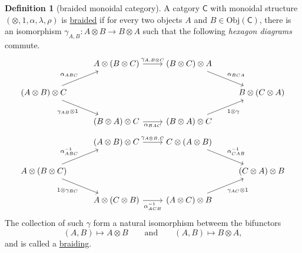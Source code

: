 \documentclass[a4paper]{report}
\newcommand{\defn}[1]{\ul{#1}}
\newcommand{\Obj}{\mathrm{Obj}}
\theoremstyle{definition}
\newtheorem{definition}{Definition}[section]
\theoremstyle{plain}
\theoremstyle{remark}
\begin{document}
\begin{definition}[braided monoidal category]
  \label{def:braidedmonoidalcategory}
  A catgory $\mathsf{C}$ with monoidal structure $(\otimes, 1, \alpha, \lambda, \rho)$ is \defn{braided} if for every two objects $A$ and $B \in \Obj(\mathsf{C})$, there is an isomorphism $\gamma_{A,B}\colon A \otimes B \to B \otimes A$ such that the following \emph{hexagon diagrams} commute.
  \begin{equation*}
    \begin{tikzcd}
      & A \otimes (B \otimes C) \arrow[r, "{\gamma_{A, B \otimes C}}"] & (B \otimes C) \otimes A \arrow[dr, "\alpha_{BCA}"] & \\
      (A \otimes B) \otimes C \arrow[ur, "\alpha_{ABC}"] \arrow[dr, swap, "\gamma_{AB} \otimes 1"] & & & B \otimes (C \otimes A) \\
      & (B \otimes A) \otimes C \arrow[r, swap, "\alpha_{BAC}"] & (B \otimes A) \otimes C \arrow[ur, swap, "1 \otimes \gamma"]
    \end{tikzcd}
  \end{equation*}
  \begin{equation*}
    \begin{tikzcd}
      & (A \otimes B) \otimes C \arrow[r, "{\gamma_{A \otimes B, C}}"] & C \otimes (A \otimes B) \arrow[dr, "\alpha^{-1}_{CAB}"] \\
      A \otimes (B \otimes C) \arrow[ur, "\alpha_{ABC}^{-1}"] \arrow[dr, swap, "1 \otimes \gamma_{BC}"] & & & (C \otimes A) \otimes B \\
      & A \otimes (C \otimes B) \arrow[r, swap, "\alpha^{-1}_{ACB}"] & (A \otimes C) \otimes B \arrow[ur, swap, "\gamma_{AC} \otimes 1"]
    \end{tikzcd} 
  \end{equation*}
  The collection of such $\gamma$ form a natural isomorphism betweem the bifunctors 
  \begin{equation*}
    (A, B) \mapsto A \otimes B\qquad\text{and}\qquad (A,B) \mapsto B \otimes A,
  \end{equation*}
  and is called a \defn{braiding}.
\end{definition}
\end{document}
